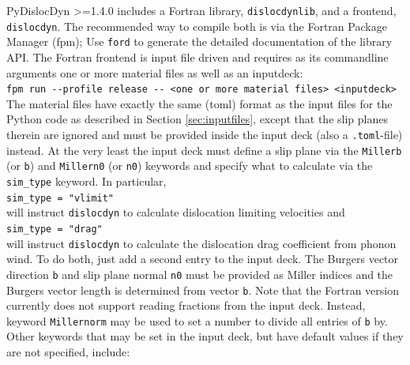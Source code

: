 \documentclass[11pt,letterpaper,oneside]{article}
\begin{document}
PyDislocDyn >=1.4.0 includes a Fortran library, \verb|dislocdynlib|, and a frontend, \verb|dislocdyn|.
The recommended way to compile both is via the Fortran Package Manager (fpm);
Use \verb|ford| to generate the detailed documentation of the library API.
The Fortran frontend is input file driven and requires as its commandline arguments one or more material files as well as an inputdeck:
\\\verb|fpm run --profile release -- <one or more material files> <inputdeck>|\\
The material files have exactly the same (toml) format as the input files for the Python code as described in Section \ref{sec:inputfiles}, except that the slip planes therein are ignored and must be provided inside the input deck (also a \verb|.toml|-file) instead.
At the very least the input deck must define a slip plane via the \verb|Millerb| (or \verb|b|) and \verb|Millern0| (or \verb|n0|) keywords and specify what to calculate via the \verb|sim_type| keyword.
In particular, 
\\\verb|sim_type = "vlimit"|\\
will instruct \verb|dislocdyn| to calculate dislocation limiting velocities and
\\\verb|sim_type = "drag"|\\
will instruct \verb|dislocdyn| to calculate the dislocation drag coefficient from phonon wind.
To do both, just add a second entry to the input deck.
The Burgers vector direction \verb|b| and slip plane normal \verb|n0| must be provided as Miller indices and the Burgers vector length is determined from vector \verb|b|.
Note that the Fortran version currently does not support reading fractions from the input deck.
Instead, keyword \verb|Millernorm| may be used to set a number to divide all entries of \verb|b| by.
Other keywords that may be set in the input deck, but have default values if they are not specified, include:
\end{document}
